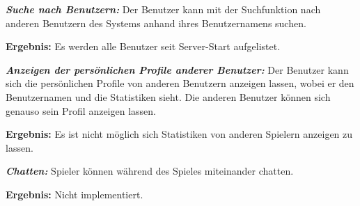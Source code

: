 \documentclass[parskip=full]{scrartcl}
\begin{document}
\begin{description}
	\item[F1050] \textbf{\textit{Suche nach Benutzern: }} Der Benutzer kann mit der Suchfunktion nach anderen Benutzern des Systems anhand ihres Benutzernamens suchen.
	\item \textbf{Ergebnis: } Es werden alle Benutzer seit Server-Start aufgelistet.
	
	\item[F1060]  \textbf{\textit{Anzeigen der persönlichen Profile anderer Benutzer: }}
	Der Benutzer kann sich die persönlichen Profile von anderen Benutzern anzeigen lassen, wobei er den Benutzernamen und die Statistiken sieht. Die anderen Benutzer können sich genauso sein Profil anzeigen lassen.
	\item \textbf{Ergebnis: } Es ist nicht möglich sich Statistiken von anderen Spielern anzeigen zu lassen.
	
	\item[F1070] \textbf{\textit{Chatten: }} Spieler können während des Spieles miteinander chatten.	
	\item \textbf{Ergebnis: } Nicht implementiert.
	
\end{description}
\end{document}
